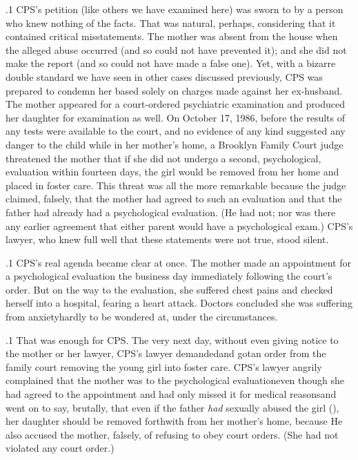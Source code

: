 \documentclass[11pt, twoside]{article}
\begin{document}
{\p.1{%
CPS's petition (like others we have examined here) was sworn to by a
person who knew nothing of the facts. That was natural, perhaps, considering that it contained critical misstatements. The mother was absent
from the house when the alleged abuse occurred (and so could not have
prevented it); and she did not make the report (and so could not have
made a false one). Yet, with a bizarre double standard we have seen in
other cases discussed previously, CPS was prepared to condemn her
based solely on charges made against her ex-husband.
The mother appeared for a court-ordered psychiatric examination
and produced her daughter for examination as well. On October 17,
1986, before the results of any tests were available to the court, and
no evidence of any kind suggested any danger to the child while in her
mother's home, a Brooklyn Family Court judge threatened the mother
that if she did not undergo a second, psychological, evaluation within
fourteen days, the girl would be removed from her home and placed
in foster care. This threat was all the more remarkable because the judge
claimed, falsely, that the mother had agreed to such an evaluation and
that the father had already had a psychological evaluation. (He had not;
nor was there any earlier agreement that either parent would have a psychological exam.) CPS's lawyer, who knew full well that these statements
were not true, stood silent.
}%

\p.1{%
CPS's real agenda became clear at once. The mother made an appointment for a psychological evaluation the business day immediately
following the court's order. But on the way to the evaluation, she suffered chest pains and checked herself into a hospital, fearing a heart
attack. Doctors concluded she was suffering from anxiety\mdash{}hardly to be
wondered at, under the circumstances.
}%

\p.1{%
That was enough for CPS. The very next day, without even giving notice to the mother or her lawyer, CPS's lawyer demanded\mdash{}and got\mdash{}an
order from the family court removing the young girl into foster care.
CPS's lawyer angrily complained that the mother was  to the
psychological evaluation\mdash{}even though she had agreed to the appointment and had only missed it for medical reasons\mdash{}and went on to say,
brutally, that even if the father \textit{had} sexually abused the girl (), her daughter should be removed forthwith from
her mother's home, because  He also accused the mother,
falsely, of refusing to obey court orders. (She had not violated any court
order.)
}%

}
\end{document}
